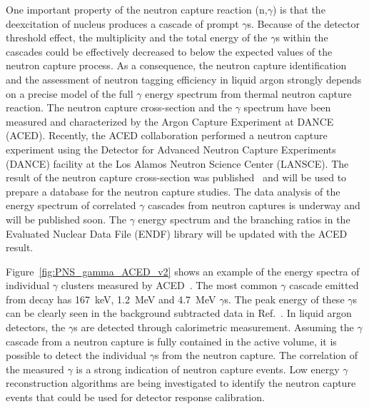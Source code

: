 One important property of the neutron capture reaction (n,$\gamma$) is that the deexcitation of  nucleus produces a cascade of prompt $\gamma$s. Because of the detector threshold effect, the multiplicity and the
total energy of the $\gamma$s within the cascades could be effectively decreased to below the expected values of the neutron capture process. As a consequence, the neutron capture identification and the assessment of neutron tagging efficiency in liquid argon strongly depends on a precise model of the full $\gamma$ energy spectrum from thermal neutron capture reaction. The neutron capture cross-section and the $\gamma$ spectrum have been measured and characterized by the Argon Capture Experiment at DANCE (ACED). %
Recently, the ACED collaboration performed a neutron capture experiment using the Detector for Advanced  Neutron  Capture  Experiments (DANCE) facility  at the  Los  Alamos  Neutron  Science  Center (LANSCE). The result of the neutron capture cross-section was published~\cite{Fischer:2019qfr} and will be used to prepare a database for the neutron capture studies. The data analysis of the energy spectrum of correlated $\gamma$ cascades from neutron captures is underway and will be published soon. The $\gamma$ energy spectrum and the branching ratios in the Evaluated Nuclear Data File (ENDF) library will be updated with the ACED result. 

Figure~\ref{fig:PNS_gamma_ACED_v2} shows an example of the energy spectra of individual $\gamma$ clusters measured by ACED~\cite{Fischer:2019qfr}. The most common $\gamma$ cascade emitted from  decay has \SI{167}{keV}, \SI{1.2}{MeV} and \SI{4.7}{MeV} $\gamma$s. The peak energy of these $\gamma$s can be clearly seen in the background subtracted data in Ref.~\cite{Fischer:2019qfr}. In liquid argon detectors, the $\gamma$s are detected through calorimetric measurement. Assuming the $\gamma$ cascade from a neutron capture is fully contained in the active volume, it is possible to detect the individual $\gamma$s from the neutron capture. The correlation of the measured $\gamma$ is a strong indication of neutron capture events. Low energy $\gamma$ reconstruction algorithms are being investigated to identify the neutron capture events that could be used for detector response calibration. 

